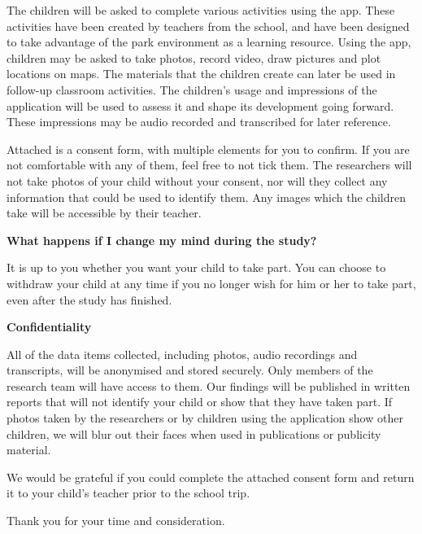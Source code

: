 The children will be asked to complete various activities using the app. These activities have been created by teachers from the school, and have been designed to take advantage of the park environment as a learning resource. Using the app, children may be asked to take photos, record video, draw pictures and plot locations on maps. The materials that the children create can later be used in follow-up classroom activities. The children’s usage and impressions of the application will be used to assess it and shape its development going forward. These impressions may be audio recorded and transcribed for later reference. 

Attached is a consent form, with multiple elements for you to confirm. If you are not comfortable with any of them, feel free to not tick them. The researchers will not take photos of your child without your consent, nor will they collect any information that could be used to identify them. Any images which the children take will be accessible by their teacher.  

\vspace{5mm}

\textbf{What happens if I change my mind during the study?}

It is up to you whether you want your child to take part. You can choose to withdraw your child at any time if you no longer wish for him or her to take part, even after the study has finished.  

\vspace{5mm}

\textbf{Confidentiality} 

All of the data items collected, including photos, audio recordings and transcripts, will be anonymised and stored securely. Only members of the research team will have access to them. Our findings will be published in written reports that will not identify your child or show that they have taken part. If photos taken by the researchers or by children using the application show other children, we will blur out their faces when used in publications or publicity material.  

\vspace{5mm}

We would be grateful if you could complete the attached consent form and return it to your child’s teacher prior to the school trip. 

\vspace{5mm}

Thank you for your time and consideration.   

